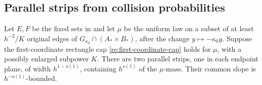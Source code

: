 \subsection{Parallel strips from collision probabilities}

\begin{lemma}\label{re:parallel-strips}
Let \(E,F\) be the fixed sets in  and let
\(\mu\) be the uniform law on a subset of at least \(h^{-2}/K\)
original edges of \(G_{\kappa_0}\cap(A_*\times B_*)\), after
the change \(y\mapsto-\kappa_0y\).  Suppose the first-coordinate
rectangle cap \eqref{re:first-coordinate-cap} holds for \(\mu\),
with a possibly enlarged subpower \(K\).  There are two parallel
strips, one in each endpoint plane, of width \(h^{1-o(1)}\),
containing \(h^{o(1)}\) of the \(\mu\)-mass.  Their common slope is
\(h^{-o(1)}\)-bounded.
\end{lemma}
